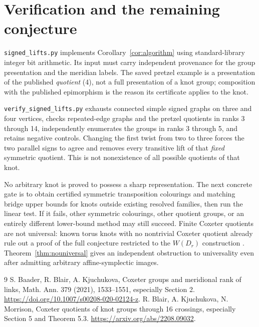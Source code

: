 \documentclass[11pt]{article}
\begin{document}
\section{Verification and the remaining conjecture}

\texttt{signed\_lifts.py} implements Corollary~\ref{cor:algorithm} using
standard-library integer bit arithmetic. Its input must carry independent
provenance for the group presentation and the meridian labels. The saved
pretzel example is a presentation of the published \emph{quotient} (4),
not a full presentation of a knot group; composition with the published
epimorphism is the reason its certificate applies to the knot.

\texttt{verify\_signed\_lifts.py} exhausts connected simple signed graphs
on three and four vertices, checks repeated-edge graphs and the pretzel
quotients in ranks 3 through 14, independently enumerates the groups in
ranks 3 through 5, and retains negative controls. Changing the first
twist from two to three forces the two parallel signs to agree and
removes every transitive lift of that \emph{fixed} symmetric quotient.
This is not nonexistence of all possible quotients of that knot.

No arbitrary knot is proved to possess a sharp representation. The next
concrete gate is to obtain certified symmetric transposition colourings
and matching bridge upper bounds for knots outside existing resolved
families, then run the linear test. If it fails, other symmetric
colourings, other quotient groups, or an entirely different lower-bound
method may still succeed. Finite Coxeter quotients are not universal:
known torus knots with no nontrivial Coxeter quotient already rule out
a proof of the full conjecture restricted to the $W(D_r)$ construction
\cite{bkm}. Theorem~\ref{thm:nouniversal} gives an independent obstruction
to universality even after admitting arbitrary affine-symplectic images.

\begin{thebibliography}{9}
 S. Baader, R. Blair, A. Kjuchukova,
Coxeter groups and meridional rank of links,
Math. Ann. 379 (2021), 1533--1551, especially Section 2.
\url{https://doi.org/10.1007/s00208-020-02124-z}.
 R. Blair, A. Kjuchukova, N. Morrison,
Coxeter quotients of knot groups through 16 crossings,
especially Section 5 and Theorem 5.3.
\url{https://arxiv.org/abs/2208.09032}.
\end{thebibliography}
\end{document}
